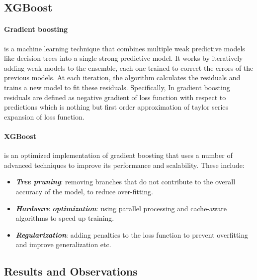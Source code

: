 \documentclass{article}
\begin{document}
\vspace{1em}
\subsection{XGBoost}

\paragraph{Gradient boosting} is a machine learning technique that combines multiple weak predictive models like decision trees into a single strong predictive model. It works by iteratively adding weak models to the ensemble, each one trained to correct the errors of the previous models. At each iteration, the algorithm calculates the residuals and trains a new model to fit these residuals. Specifically, In gradient boosting residuals are defined as negative gradient of loss function with respect to predictions which is nothing but first order approximation of taylor series expansion of loss function. 

\paragraph{XGBoost} is an optimized implementation of gradient boosting that uses a number of
advanced techniques to improve its performance and scalability. These include:

\begin{itemize}
	\item \textbf{\textit{Tree pruning}}: removing branches that do not contribute to the overall accuracy of the	model, to reduce over-fitting.
	\item \textbf{\textit{Hardware optimization}}: using parallel processing and cache-aware algorithms to speed up training.
	\item \textbf{\textit{Regularization}}: adding penalties to the loss function to prevent overfitting and improve generalization	etc.
\end{itemize}

\subsection{Results and Observations}


\vspace{1em}
\end{document}
